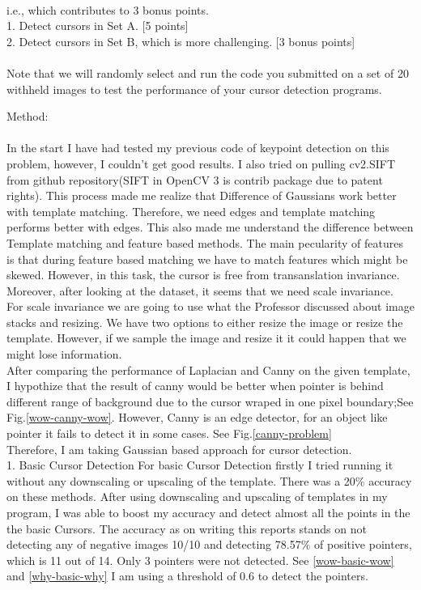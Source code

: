 \documentclass[12pt]{article}
\newenvironment{QandA}
{
	\begin{enumerate}[label=\normalfont\arabic*.,leftmargin=2em,rightmargin=2em]\normalfont
	}
	{
	\end{enumerate}
}
\newenvironment{answered}{\setlength{\parindent}{1em}\par\normalfont}{}
\begin{document}
\begin{QandA}
\\
i.e., which contributes to 3 bonus points.
\\
1. Detect cursors in Set A. [5 points]
\\
2. Detect cursors in Set B, which is more challenging. [3 bonus points]
\\
\\
Note that we will randomly select and run the code you submitted on a set of 20 withheld images to test the
performance of your cursor detection programs.
\begin{answered}
Method:
\\
\\
In the start I have had tested my previous code of keypoint detection on this problem, however, I couldn't get good results. I also tried on pulling cv2.SIFT from github repository(SIFT in OpenCV 3 is contrib package due to patent rights). This process made me realize that Difference of Gaussians work better with template matching. Therefore, we need edges and template matching performs better with edges. This also made me understand the difference between Template matching and feature based methods. The main pecularity of features is that during feature based matching we have to match features which might be skewed. However, in this task, the cursor is free from transanslation invariance. Moreover, after looking at the dataset, it seems that we need scale invariance.
\\
For scale invariance we are going to use what the Professor discussed about image stacks and resizing. We have two options to either resize the image or resize the template. However, if we sample the image and resize it it could happen that we might lose information.
\\
After comparing the performance of Laplacian and Canny on the given template, I hypothize that the result of canny would be better when pointer is behind different range of background due to the cursor wraped in one pixel boundary;See Fig.{\ref{wow-canny-wow}}. However, Canny is an edge detector, for an object like pointer it fails to detect it in some cases. See Fig.{\ref{canny-problem}}
\\
Therefore, I am taking Gaussian based approach for cursor detection.
\\
1. Basic Cursor Detection
For basic Cursor Detection firstly I tried running it without any downscaling or upscaling of the template. There was a 20$\%$ accuracy on these methods. After using downscaling and upscaling of templates in my program, I was able to boost my accuracy and detect almost all the points in the the basic Cursors. The accuracy as on writing this reports stands on not detecting any of negative images 10/10 and detecting 78.57$\%$ of positive pointers, which is 11 out of 14. Only 3 pointers were not detected. See {\ref{wow-basic-wow} and \ref{why-basic-why} } I am using a threshold of 0.6 to detect the pointers.

\end{answered}
\end{QandA}
\end{document}
